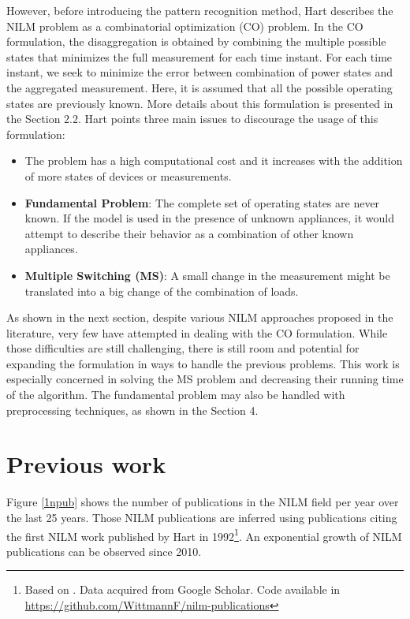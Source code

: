 However, before introducing the pattern recognition method, Hart describes the NILM problem as a combinatorial optimization (CO) problem. In the CO formulation, the disaggregation is obtained by combining the multiple possible states that minimizes the full measurement for each time instant. For each time instant, we seek to minimize the error between combination of power states and the aggregated measurement. Here, it is assumed that all the possible operating states are previously known. More details about this formulation is presented in the Section 2.2. Hart points three main issues to discourage the usage of this formulation: 
\begin{itemize}
\item The problem has a high computational cost and it increases with the addition of more states of devices or measurements.
\item \textbf{Fundamental Problem}: The complete set of operating states are never known. If the model is used in the presence of unknown appliances, it would attempt to describe their behavior as a combination of other known appliances. 
\item \textbf{Multiple Switching (MS)}: A small change in the measurement might be translated into a big change of the combination of loads. 
\end{itemize}
As shown in the next section, despite various NILM approaches proposed in the literature, very few have attempted in dealing with the CO formulation. While those difficulties are still challenging, there is still room and potential for expanding the formulation in ways to handle the previous problems. This work is especially concerned in solving the MS problem and decreasing their running time of the algorithm. The fundamental problem may also be handled with preprocessing techniques, as shown in the Section 4.  


\section{Previous work}

Figure \ref{1npub} shows the number of publications in the NILM field per year over the last 25 years. Those NILM publications are inferred using publications citing the first NILM work published by Hart in 1992\footnote{Based on \cite{1npub}. Data acquired from Google Scholar. Code available in \url{https://github.com/WittmannF/nilm-publications}}. An exponential growth of NILM publications can be observed since 2010.

